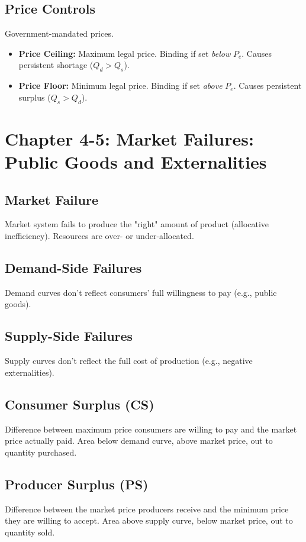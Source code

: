 \documentclass{article}
\begin{document}
\subsection*{Price Controls}
Government-mandated prices.
\begin{itemize}
    \item \textbf{Price Ceiling:} Maximum legal price. Binding if set \textit{below} $P_e$. Causes persistent shortage ($Q_d > Q_s$).
    \item \textbf{Price Floor:} Minimum legal price. Binding if set \textit{above} $P_e$. Causes persistent surplus ($Q_s > Q_d$).
\end{itemize}

\section*{Chapter 4-5: Market Failures: Public Goods and Externalities}

\subsection*{Market Failure}
Market system fails to produce the "right" amount of product (allocative inefficiency). Resources are over- or under-allocated.

\subsection*{Demand-Side Failures}
Demand curves don't reflect consumers' full willingness to pay (e.g., public goods).

\subsection*{Supply-Side Failures}
Supply curves don't reflect the full cost of production (e.g., negative externalities).

\subsection*{Consumer Surplus (CS)}
Difference between maximum price consumers are willing to pay and the market price actually paid. Area below demand curve, above market price, out to quantity purchased.

\subsection*{Producer Surplus (PS)}
Difference between the market price producers receive and the minimum price they are willing to accept. Area above supply curve, below market price, out to quantity sold.
\end{document}
